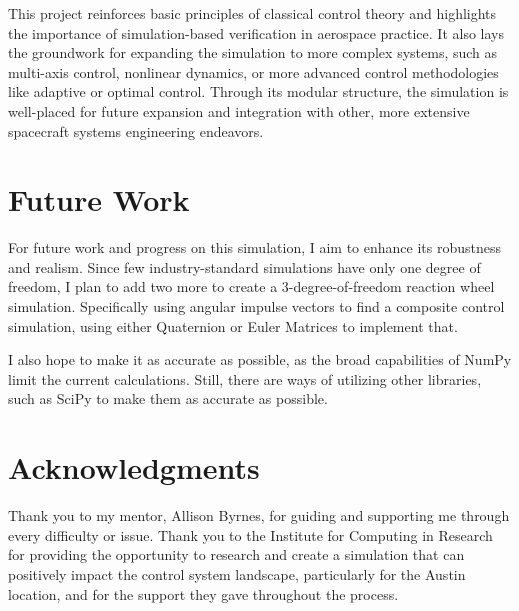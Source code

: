 \documentclass{ifacconf}
\begin{document}
This project reinforces basic principles of classical control theory and highlights the importance of simulation-based verification in aerospace practice. It also lays the groundwork for expanding the simulation to more complex systems, such as multi-axis control, nonlinear dynamics, or more advanced control methodologies like adaptive or optimal control. Through its modular structure, the simulation is well-placed for future expansion and integration with other, more extensive spacecraft systems engineering endeavors.



\section{Future Work}

For future work and progress on this simulation, I aim to enhance its robustness and realism. Since few industry-standard simulations have only one degree of freedom, I plan to add two more to create a 3-degree-of-freedom reaction wheel simulation. Specifically using angular impulse vectors to find a composite control simulation, using either Quaternion or Euler Matrices to implement that. 

I also hope to make it as accurate as possible, as the broad capabilities of NumPy limit the current calculations. Still, there are ways of utilizing other libraries, such as SciPy to make them as accurate as possible. 

\section{Acknowledgments}

Thank you to my mentor, Allison Byrnes, for guiding and supporting me through every difficulty or issue. Thank you to the Institute for Computing in Research for providing the opportunity to research and create a simulation that can positively impact the control system landscape, particularly for the Austin location, and for the support they gave throughout the process.



 
\end{document}
